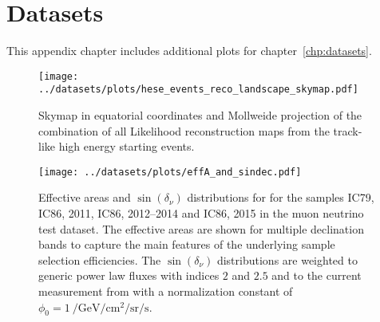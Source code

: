 \section{Datasets}
This appendix chapter includes additional plots for chapter~\ref{chp:datasets}.

\begin{figure}[H]
  \centering
  \texttt{[image: ../datasets/plots/hese\_events\_reco\_landscape\_skymap.pdf]}
  \caption[Combined Likelihood skymap of the 22 HESEs]{
    Skymap in equatorial coordinates and Mollweide projection of the combination of all Likelihood reconstruction maps from the track-like high energy starting events.
  }
  \label{fig:hese_events_reco_landscape_skymap}
\end{figure}

\begin{figure}[H]
  \centering
  \texttt{[image: ../datasets/plots/effA\_and\_sindec.pdf]}
  \caption[Effective areas and $\sin(\delta_\nu)$ distributions]{
    Effective areas and $\sin(\delta_\nu)$ distributions for for the samples IC79, IC86, 2011, IC86, 2012--2014 and IC86, 2015 in the muon neutrino test dataset.
    The effective areas are shown for multiple declination bands to capture the main features of the underlying sample selection efficiencies.
    The $\sin(\delta_\nu)$ distributions are weighted to generic power law fluxes with indices $2$ and $2.5$ and to the current measurement from \cite{Haack:2017dxi} with a normalization constant of $\phi_0 = \SI[per-mode=reciprocal]{1}{\per\GeV\per\cm\squared\per\steradian\per\second}$.
    }
  \label{fig:effA_and_sindec}
\end{figure}

